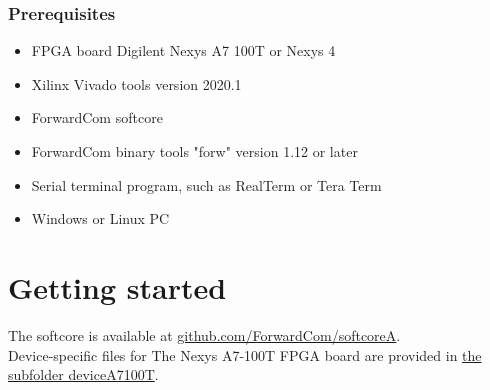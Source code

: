 \documentclass[11pt,a4paper,oneside,openright]{report}
\newcommand{\vv}{ \vspace{2mm} }   %
\begin{document}
\subsection{Prerequisites}
\begin{itemize}
\item FPGA board Digilent Nexys A7 100T or Nexys 4
\item Xilinx Vivado tools version 2020.1
\item ForwardCom softcore
\item ForwardCom binary tools "forw" version 1.12 or later
\item Serial terminal program, such as RealTerm or Tera Term
\item Windows or Linux PC
\end{itemize}
\vv


\chapter{Getting started} \label{Chap:GettingStarted}
The softcore is available at 
\href{https://github.com/ForwardCom/softcoreA}{github.com/ForwardCom/softcoreA}. \\

Device-specific files for The Nexys A7-100T FPGA board are provided in 
\href{https://github.com/ForwardCom/softcoreA/tree/main/deviceA7100T}{the subfolder deviceA7100T}. \\
\end{document}
